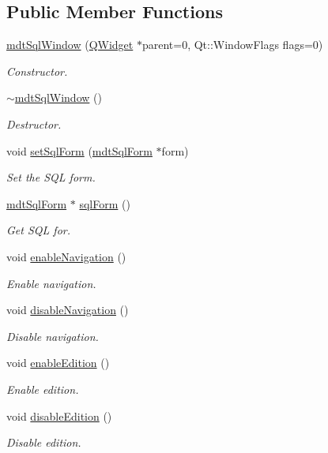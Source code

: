 \subsection*{Public Member Functions}
\begin{DoxyCompactItemize}
\item 
\hyperlink{classmdt_sql_window_a8624cc7a7a454e759c753c2faddd46e6}{mdt\-Sql\-Window} (\hyperlink{class_q_widget}{Q\-Widget} $\ast$parent=0, Qt\-::\-Window\-Flags flags=0)
\begin{DoxyCompactList}\small\item\em Constructor. \end{DoxyCompactList}\item 
\hyperlink{classmdt_sql_window_a050588d255a48722438421b754b808f3}{$\sim$mdt\-Sql\-Window} ()
\begin{DoxyCompactList}\small\item\em Destructor. \end{DoxyCompactList}\item 
void \hyperlink{classmdt_sql_window_ad9a237b7bea72d92a4743f09c28e38ae}{set\-Sql\-Form} (\hyperlink{classmdt_sql_form}{mdt\-Sql\-Form} $\ast$form)
\begin{DoxyCompactList}\small\item\em Set the S\-Q\-L form. \end{DoxyCompactList}\item 
\hyperlink{classmdt_sql_form}{mdt\-Sql\-Form} $\ast$ \hyperlink{classmdt_sql_window_acf5dc11eb376693ba8114230ff75cfe7}{sql\-Form} ()
\begin{DoxyCompactList}\small\item\em Get S\-Q\-L for. \end{DoxyCompactList}\item 
void \hyperlink{classmdt_sql_window_a6d4d853c8c64a99ff2e396b99ea63a87}{enable\-Navigation} ()
\begin{DoxyCompactList}\small\item\em Enable navigation. \end{DoxyCompactList}\item 
void \hyperlink{classmdt_sql_window_a961d587d63b0997a10db6728773a108f}{disable\-Navigation} ()
\begin{DoxyCompactList}\small\item\em Disable navigation. \end{DoxyCompactList}\item 
void \hyperlink{classmdt_sql_window_a42d1283a05eddd2a48af74cf764ef240}{enable\-Edition} ()
\begin{DoxyCompactList}\small\item\em Enable edition. \end{DoxyCompactList}\item 
void \hyperlink{classmdt_sql_window_a629fa57fcdde0e4db0fc93efd84c9123}{disable\-Edition} ()
\begin{DoxyCompactList}\small\item\em Disable edition. \end{DoxyCompactList}\end{DoxyCompactItemize}


